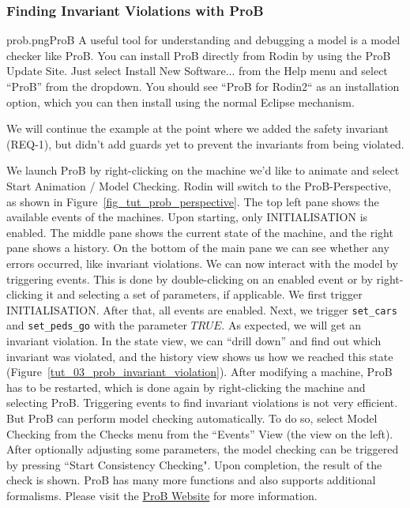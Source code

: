 
\subsubsection{Finding Invariant Violations with ProB}
\label{tut:prob}
\begin{rodin-plugin}{prob.png}{ProB}
A useful tool for understanding and debugging a model is a model checker like ProB. You can install ProB directly from Rodin by using the ProB Update Site.  Just select \textsf{Install New Software...} from the \textsf{Help} menu and select ``ProB'' from the dropdown. You should see ``ProB for Rodin2`` as an installation option, which you can then install using the normal Eclipse mechanism. 

We will continue the example at the point where we added the safety invariant (REQ-1), but didn't add guards yet to prevent the invariants from being violated.

We launch ProB by right-clicking on the machine we'd like to animate and select \textsf{Start Animation / Model Checking}.  Rodin will switch to the ProB-Perspective, as shown in Figure~\ref{fig_tut_prob_perspective}. The top left pane shows the available events of the machines.  Upon starting, only INITIALISATION is enabled.  The middle pane shows the current state of the machine, and the right pane shows a history.  On the bottom of the main pane we can see whether any errors occurred, like invariant violations. We can now interact with the model by triggering events.  This is done by double-clicking on an enabled event or by right-clicking it and selecting a set of parameters, if applicable.  We first trigger INITIALISATION.  After that, all events are enabled.  Next, we trigger \texttt{set\_cars} and \texttt{set\_peds\_go}  with the parameter $TRUE$.  As expected, we will get an invariant violation.  In the state view, we can ``drill down'' and find out which invariant was violated, and the history view shows us how we reached this state (Figure~\ref{tut_03_prob_invariant_violation}). After modifying a machine, ProB has to be restarted, which is done again by right-clicking the machine and selecting ProB.  Triggering events to find invariant violations is not very efficient.  But ProB can perform model checking automatically.  To do so, select \textsf{Model Checking} from the \textsf{Checks} menu from the ``Events'' View (the view on the left).  After optionally adjusting some parameters, the model checking can be triggered by pressing ``Start Consistency Checking".  Upon completion, the result of the check is shown. ProB has many more functions and also supports additional formalisms. Please visit the \href{http://www.stups.uni-duesseldorf.de/ProB}{ProB Website} for more information.

\end{rodin-plugin}

